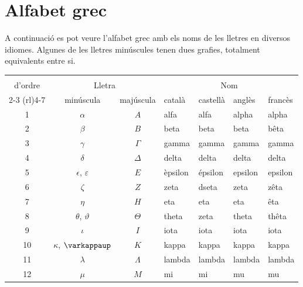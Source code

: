  
 
 
 
 


\section*{Alfabet grec} 

A continuació es pot veure l'alfabet grec
amb els noms de les  lletres en diversos idiomes. Algunes de les lletres minúscules tenen dues grafies, totalment equivalents entre si.

\begin{center}
\begin{threeparttable}
	\begin{tabular}{cccllll}
		\toprule[1pt]
		\renewcommand*{\multirowsetup}{\centering}
		\multirow{2}{15mm}{\rule{0mm}{4.5mm}Número\\d'ordre} & \multicolumn{2}{c}{Lletra} &
		\multicolumn{4}{c}{Nom} \\
		\cmidrule(rl){2-3} \cmidrule(rl){4-7}
		& minúscula & majúscula & català & castellà &  anglès & francès\\
		\midrule
		1  & $\alpha$ & $A$ & alfa & alfa &  alpha & alpha\\
		2  & $\beta$ & $B$ & beta & beta &  beta & bêta\\
		3  & $\gamma$ & $\Gamma$ & gamma & gamma &  gamma & gamma\\
		4  & $\delta$ & $\Delta$ & delta & delta &  delta & delta\\
		5  & $\epsilon$, $\varepsilon$ & $E$ & èpsilon & épsilon &  epsilon & epsilon\\
		6  & $\zeta$ & $Z$ & zeta & dseta &  zeta & zêta\\
		7  & $\eta$ & $H$ & eta & eta &  eta & êta\\
		8  & $\theta$, $\vartheta$ & $\Theta$ & theta & zeta &  theta & thêta\\
		9  & $\iota$ & $I$ & iota & iota &  iota & iota\\
		10 & $\kappa$, $\varkappaup$ & $K$ & kappa & kappa &  kappa & kappa\\
		11 & $\lambda$ & $\Lambda$ & lambda & lambda &  lambda &lambda\\
		12 & $\mu$ & $M$ & mi & mi &  mu & mu\\

\end{tabular}
\end{threeparttable}
\end{center}
